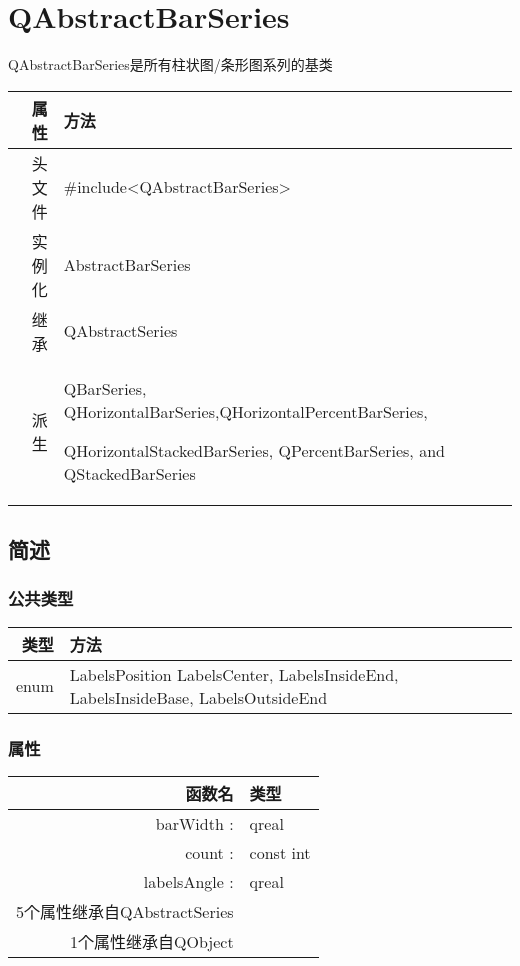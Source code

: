 \chapter{QAbstractBarSeries}

QAbstractBarSeries是所有柱状图/条形图系列的基类

\begin{tabular}{|r|l|}
	\hline
	属性 & 方法 \\
	\hline
	头文件 & \#include<QAbstractBarSeries>\\      
	\hline
	实例化 & AbstractBarSeries\\      
	\hline
	继承&QAbstractSeries \\
	\hline
	派生 & QBarSeries, QHorizontalBarSeries,QHorizontalPercentBarSeries,

 QHorizontalStackedBarSeries, QPercentBarSeries, and QStackedBarSeries \\
	\hline
\end{tabular}

\splitLine

\section{简述}

\subsection{公共类型}

\begin{tabular}{|r|l|}
\hline
类型 & 方法 \\
\hline
enum&	LabelsPosition { LabelsCenter, LabelsInsideEnd, LabelsInsideBase, LabelsOutsideEnd }\\
\hline
\end{tabular}

\subsection{属性}

\begin{tabular}{|r|l|}
\hline
函数名 & 类型 \\
\hline
barWidth :	&qreal\\
\hline
count :	&const int\\
\hline
labelsAngle :&qreal\\
\hline
5个属性继承自QAbstractSeries &	\\
\hline
1个属性继承自QObject	&\\
\hline
\end{tabular}

